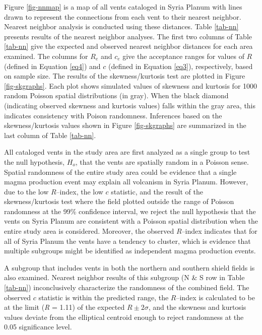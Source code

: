 \documentclass[preprint,review,authoryear,12pt]{elsarticle}
\begin{document}
Figure \ref{fig-nnmap} is a map of all vents cataloged in Syria Planum with lines drawn to represent the connections from each vent to their nearest neighbor. Nearest neighbor analysis is conducted using these distances. Table \ref{tab-nn} presents results of the nearest neighbor analyses. The first two columns of Table \ref{tab-nn} give the expected and observed nearest neighbor distances for each area examined. The columns for $R_e$ and $c_e$ give the acceptance ranges for values of $R$ (defined in Equation \ref{eq4}) and $c$ (defined in Equation \ref{eq3}), respectively, based on sample size. The results of the skewness/kurtosis test are plotted in Figure \ref{fig-skgraphs}. Each plot shows simulated values of skewness and kurtosis for 1000 random Poisson spatial distributions (in gray). When the black diamond (indicating observed skewness and kurtosis values) falls within the gray area, this indicates consistency with Poison randomness. Inferences based on the skewness/kurtosis values shown in Figure \ref{fig-skgraphs} are summarized in the last column of Table \ref{tab-nn}.

All cataloged vents in the study area are first analyzed as a single group to test the null hypothesis, $H_o$, that the vents are spatially random in a Poisson sense. Spatial randomness of the entire study area could be evidence that a single magma production event may explain all volcanism in Syria Planum. However, due to the low $R$--index, the low $c$ statistic, and the result of the skewness/kurtosis test where the field plotted outside the range of Poisson randomness at the 99\% confidence interval, we reject the null hypothesis that the vents on Syria Planum are consistent with a Poisson spatial distribution when the entire study area is considered. Moreover, the observed $R$--index indicates that for all of Syria Planum the vents have a tendency to cluster, which is evidence that multiple subgroups might be identified as independent magma production events.

A subgroup that includes vents in both the northern and southern shield fields is also examined. Nearest neighbor results of this subgroup (N \& S row in Table \ref{tab-nn}) inconclusively characterize the randomness of the combined field. The observed $c$ statistic is within the predicted range, the $R$--index is calculated to be at the limit (\textit{R} = 1.11) of the expected $R \pm 2\sigma$, and the skewness and kurtosis values deviate from the elliptical centroid enough to reject randomness at the 0.05 significance level.
\end{document}
